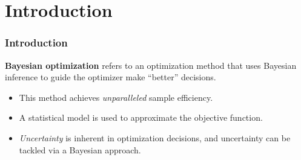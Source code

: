 \section{Introduction}
\begin{frame}
    \frametitle{Introduction}
    \textbf{Bayesian optimization} refers to an optimization method that uses
    Bayesian inference to guide the optimizer make ``better'' decisions.
    \begin{itemize}
        \item This method achieves \emph{unparalleled} sample efficiency.
        \item A statistical model is used to approximate the objective function.
        \item \emph{Uncertainty} is inherent in optimization decisions, and
                uncertainty can be tackled via a Bayesian approach.
    \end{itemize}

\end{frame}